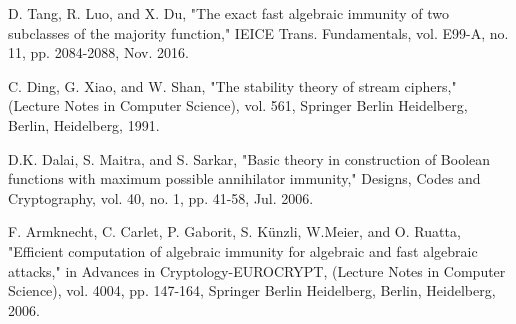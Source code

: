 \documentclass[mathserif,8pt]{beamer}
\begin{document}
\begin{thebibliography}{99}
	 D. Tang, R. Luo, and X. Du, "The exact fast algebraic immunity of two subclasses of the majority function," IEICE Trans. Fundamentals, vol. E99-A, no. 11, pp. 2084-2088, Nov. 2016.
	
	   C. Ding, G. Xiao, and W. Shan, "The stability theory of stream ciphers," (Lecture Notes in Computer Science), vol. 561, Springer Berlin Heidelberg, Berlin, Heidelberg, 1991.
	
	    D.K. Dalai, S. Maitra, and S. Sarkar, "Basic theory in construction of Boolean functions with maximum possible annihilator immunity," Designs, Codes and Cryptography, vol. 40, no. 1, pp. 41-58, Jul. 2006.
	
	   F. Armknecht, C. Carlet, P. Gaborit, S. K\"{u}nzli, W.Meier, and O. Ruatta, "Efficient computation of algebraic immunity for algebraic and fast algebraic attacks," in Advances in Cryptology-EUROCRYPT, (Lecture Notes in Computer Science), vol. 4004, pp. 147-164, Springer Berlin Heidelberg, Berlin, Heidelberg, 2006.
	
	
	
\end{thebibliography}
\end{document}
